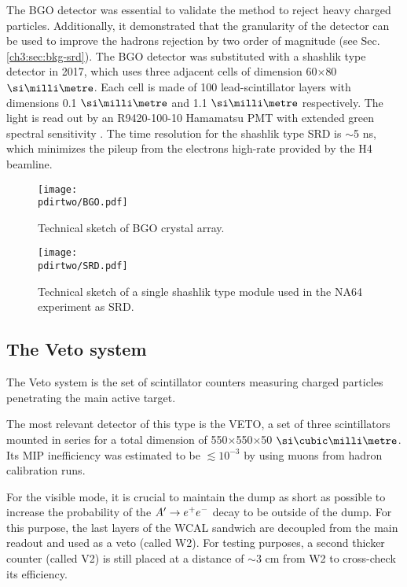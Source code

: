The BGO detector was essential to validate the method to reject heavy charged particles. Additionally, it demonstrated that the granularity of the detector can be used to improve the hadrons rejection by two order of magnitude (see Sec.\ref{ch3:sec:bkg-srd}). The BGO detector was substituted with a shashlik type detector in 2017, which uses three adjacent cells of dimension 60$\times$80 $\mmi$. Each cell is made of 100 lead-scintillator layers with dimensions 0.1 $\mmi$ and 1.1 $\mmi$ respectively. The light is read out by an R9420-100-10 Hamamatsu PMT with extended green spectral sensitivity \cite{hamamatsu-R9420-100-10}. The time resolution for the shashlik type SRD is $\sim$5 \si{ns}, which minimizes the pileup from the electrons high-rate provided by the H4 beamline. %

\begin{figure}[bth!]
\centering
\texttt{[image: \\pdirtwo/BGO.pdf]}
\caption[BGO sketch]{Technical sketch of BGO crystal array.}
\label{fig:bgo-sketch}
\end{figure}

\begin{figure}[bth!]
\centering
\texttt{[image: \\pdirtwo/SRD.pdf]}
\caption[SRD sketch]{Technical sketch of a single shashlik type module used in the NA64 experiment as SRD.}
\label{fig:srd-sketch}
\end{figure}

\subsection{The Veto system}
\label{ch2:sec:detectors-veto}

The Veto system is the set of scintillator counters measuring charged particles penetrating the main active target.

The most relevant detector of this type is the VETO, a set of three scintillators mounted in series for a total dimension of 550$\times$550$\times$50 $\mmc$. Its MIP inefficiency was estimated to be $\lesssim 10^{-3}$ by using muons from hadron calibration runs.

For the visible mode, it is crucial to maintain the dump as short as possible to increase the probability of the $A' \to e^+e^-$ decay to be outside of the dump. For this purpose, the last layers of the WCAL sandwich are decoupled from the main readout and used as a veto (called W2). For testing purposes, a second thicker counter (called V2) is still placed at a distance of $\sim3$ \si{cm} from W2 to cross-check its efficiency.

